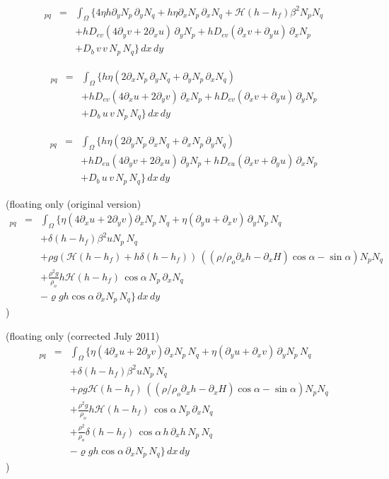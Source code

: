 \documentclass[10pt,a4paper]{book}
\newcommand{\He}{\mathcal{H}}
\newcommand{\p}{\partial}
\begin{document}
\begin{eqnarray*}
[\mathrm{K}^{vv}]_{pq} 
&=&\int_{\Omega}  \big \{
4 \eta h \p_y N_p \, \p_y N_q  + h \eta \p_x N_p \, \p_x N_q 
+ \He(h-h_f) \beta^2 N_p N_q \\
& & + h D_{ev} (4 \p_y v + 2 \p_x u) \, \p_y N_p + h D_{ev} (\p_x v + \p_y u) \, \p_x N_p \\
& & + D_b\, v \, v \,N_p \, N_q \big \} \, dx \, dy
\end{eqnarray*}



\begin{eqnarray*}
[\mathrm{K}^{uv}]_{pq}  
&=&\int_{\Omega} \big \{
h \eta ( 2 \p_x N_p \,\p_y N_q+ \p_y N_p \, \p_x N_q) \\
& & + h D_{ev} (4 \p_x u + 2 \p_y v) \, \p_x N_p + h D_{ev} (\p_x v + \p_y u) \, \p_y N_p \\
& & + D_b\, u \, v \,N_p \, N_q \big \} \, dx \, dy
\end{eqnarray*}


\begin{eqnarray*}
[\mathrm{K}^{uv}]_{pq} 
&=&\int_{\Omega} \big \{
h \eta ( 2\p_y N_p \, \p_x N_q+ \p_x N_p \, \p_y N_q) \\
& & + h D_{eu} (4 \p_y v + 2 \p_x u) \, \p_y N_p + h D_{eu} (\p_x v + \p_y u) \, \p_x N_p \\
& & + D_b\, u \, v \,N_p \, N_q \big \} \, dx \, dy
\end{eqnarray*}

(floating only (original version)
\begin{eqnarray*}
[\mathrm{K}^{xh}]_{pq} 
&=&\int_{\Omega} \big \{
\eta ( 4 \p_x u + 2 \p_y v) \p_x N_p \, N_q+ \eta (\p_y u + \p_x v) \, \p_y  N_p \, N_q \\
& & + \delta(h-h_f) \beta^2 u N_p \, N_q\\
& & + \rho g ( \He(h-h_f) + h \delta(h-h_f))\, (( \rho /\rho_o \p_x h- \p_x H) \cos \alpha  -  \sin \alpha ) N_p N_q   \\
& & + \frac{\rho^2 g}{\rho_o}  h \He(h-h_f)  \, \cos \alpha \, N_p \, \p_x N_q    \\
& & -\varrho g h \cos \alpha \,\p_x N_p \, N_q \big \} \, dx \, dy
\end{eqnarray*}
)


(floating only (corrected July 2011)
\begin{eqnarray*}
[\mathrm{K}^{xh}]_{pq} 
&=&\int_{\Omega} \big \{
\eta ( 4 \p_x u + 2 \p_y v) \p_x N_p \, N_q+ \eta (\p_y u + \p_x v) \, \p_y  N_p \, N_q \\
& & + \delta(h-h_f) \beta^2 u N_p \, N_q\\
& & + \rho g  \He(h-h_f) \, (( \rho /\rho_o \p_x h- \p_x H) \cos \alpha  -  \sin \alpha ) N_p N_q   \\
& & + \frac{\rho^2 g}{\rho_o}  h \He(h-h_f)  \, \cos \alpha \, N_p \, \p_x N_q    \\
& & + \frac{\rho^2}{\rho_o} \delta(h-h_f) \, \cos \alpha \, h\,\p_x h \, N_p \, N_q\\
& & -\varrho g h \cos \alpha \,\p_x N_p \, N_q \big \} \, dx \, dy
\end{eqnarray*}
)
\end{document}
